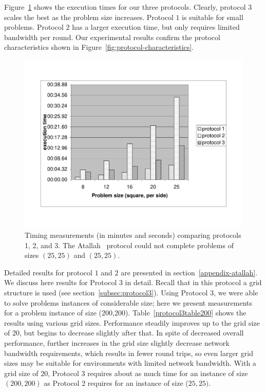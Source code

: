Figure~\ref{fig:histogram} shows the execution times for our three
protocols. Clearly, protocol $3$ scales the best as the problem size
increases. Protocol $1$ is suitable for small problems. Protocol $2$
has a larger execution time, but only requires limited bandwidth per
round. Our experimental results confirm the protocol characteristics
shown in Figure~\ref{fig:protocol-characteristics}.

\begin{figure}
\centerline{\includegraphics[bb=22bp -50bp 600bp 1000bp,scale=0.6,angle=0]{genomics/proto123}}
\caption{Timing measurements (in minutes and seconds) comparing protocols
1, 2, and 3. The Atallah~\cite{atallah} protocol could not complete problems of
sizes $(25,25)$ and $(25,25)$.}
\label{fig:histogram} 
\end{figure}

Detailed results for protocol $1$ and $2$ are presented in section~\ref{appendix-atallah}.
We discuss here results for Protocol $3$ in detail. Recall that
in this protocol a grid structure is used (see
section~\ref{subsec:protocol3}).  Using Protocol $3$, we were able to
solve problems instances of considerable size; here we present
measurements for a problem instance of size
(200,200). Table~\ref{protocol3table200} shows the results using
various grid sizes. Performance steadily improves up to the grid size
of $20$, but begins to decrease slightly after that.  In spite of
decreased overall performance, further increases in the grid size
slightly decrease network bandwidth requirements, which results in
fewer round trips, so even larger grid sizes may be suitable for
environments with limited network bandwidth.  With a grid size of
$20$, Protocol 3 requires about as much time for an instance of size
$(200,200)$ as Protocol 2 requires for an instance of size ($25,25)$.


